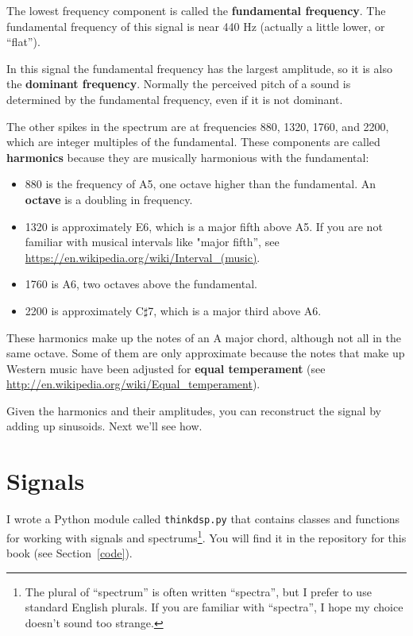 \documentclass[12pt]{book}
\begin{document}
The lowest frequency component is called the {\bf fundamental
  frequency}.  The fundamental frequency of this signal is near 440 Hz
(actually a little lower, or ``flat'').

In this signal the fundamental frequency has the largest amplitude,
so it is also the {\bf dominant frequency}.
Normally the perceived pitch of a sound is determined by the
fundamental frequency, even if it is not dominant.

The other spikes in the spectrum are at frequencies 880, 1320, 1760, and
2200, which are integer multiples of the fundamental.
These components are called {\bf harmonics} because they are
musically harmonious with the fundamental:

\begin{itemize}

\item 880 is the frequency of A5, one octave higher than the fundamental.
An {\bf octave} is a doubling in frequency.

\item 1320 is approximately E6, which is a major fifth above A5.
  If you are not familiar with musical intervals like "major fifth'', see
  \url{https://en.wikipedia.org/wiki/Interval_(music)}.

\item 1760 is A6, two octaves above the fundamental.

\item 2200 is approximately C$\sharp$7, which is a major third
above A6.

\end{itemize}

These harmonics make up the notes of an A major
chord, although not all in the same octave.  Some of them are only
approximate because the notes that make up Western music have been
adjusted for {\bf equal temperament} (see
 \url{http://en.wikipedia.org/wiki/Equal_temperament}).

Given the harmonics and their amplitudes, you can reconstruct the
signal by adding up sinusoids.
Next we'll see how.


\section{Signals}

I wrote a Python module called {\tt thinkdsp.py} that contains classes
and functions for working with signals and spectrums\footnote{The
plural of ``spectrum'' is often written ``spectra'', but I prefer
to use standard English plurals.  If you are familiar with ``spectra'',
I hope my choice doesn't sound too strange.}.  You
will find it in the repository for this book (see Section~\ref{code}).
\end{document}
